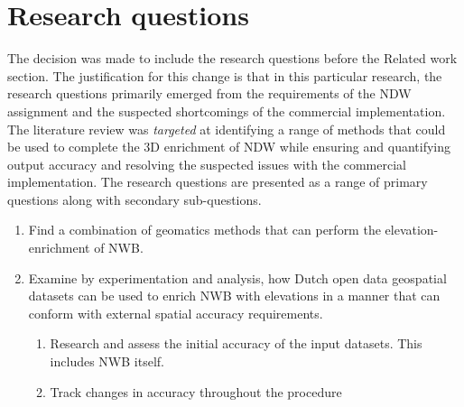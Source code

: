 
\chapter{Research questions}
\label{chap:rq}

The decision was made to include the research questions before the Related work section. The justification for this change is that in this particular research, the research questions primarily emerged from the requirements of the NDW assignment and the suspected shortcomings of the commercial implementation. The literature review was \textit{targeted} at identifying a range of methods that could be used to complete the 3D enrichment of NDW while ensuring and quantifying output accuracy and resolving the suspected issues with the commercial implementation. The research questions are presented as a range of primary questions along with secondary sub-questions.


\begin{enumerate}
\item Find a combination of geomatics methods that can perform the elevation-enrichment of NWB. 
\item Examine by experimentation and analysis, how Dutch open data geospatial datasets can be used to enrich NWB with elevations in a manner that can conform with external spatial accuracy requirements.
\begin{enumerate}
\item Research and assess the initial accuracy of the input datasets. This includes NWB itself.
\item Track changes in accuracy throughout the procedure
\end{enumerate}
\end{enumerate}